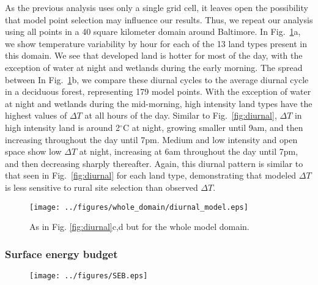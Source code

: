 \documentclass[draft,linenumbers]{agujournal}
\begin{document}
As the previous analysis uses only a single grid cell, it leaves open the possibility that model point selection may influence our results. Thus, we repeat our analysis using all points in a 40 square kilometer domain around Baltimore. In Fig.~\ref{fig:diurnal_wd}a, we show temperature variability by hour for each of the 13 land types present in this domain. We see that developed land is hotter for most of the day, with the exception of water at night and wetlands during the early morning. The spread between 
In Fig.~\ref{fig:diurnal_wd}b, we compare these diurnal cycles to the average diurnal cycle in a deciduous forest, representing 179 model points. With the exception of water at night and wetlands during the mid-morning, high intensity land types have the highest values of $\Delta T$ at all hours of the day. Similar to Fig.~\ref{fig:diurnal}, $\Delta T$ in high intensity land is around 2$^\circ$C at night, growing smaller until 9am, and then increasing throughout the day until 7pm. Medium and low intensity and open space show low $\Delta T$ at night, increasing at 6am throughout the day until 7pm, and then decreasing sharply thereafter. Again, this diurnal pattern is similar to that seen in Fig.~\ref{fig:diurnal} for each land type, demonstrating that modeled $\Delta T$ is less sensitive to rural site selection than observed $\Delta T$. 

\begin{figure}
\centering
\texttt{[image: ../figures/whole\_domain/diurnal\_model.eps]}
\caption{As in Fig. \ref{fig:diurnal}c,d but for the whole model domain.}%
\label{fig:diurnal_wd}
\end{figure}

 
\subsubsection{Surface energy budget}

\begin{figure}[h]
\centering
\texttt{[image: ../figures/SEB.eps]}
\label{fig:seb}
\end{figure}
\end{document}

